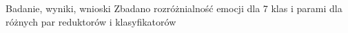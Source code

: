 \documentclass{beamer}
\begin{document}
\begin{frame}[t,fragile]{Badanie, wyniki, wnioski}
Zbadano rozróżnialność emocji dla 7 klas i parami dla różnych par reduktorów i klasyfikatorów
\end{frame}
\end{document}
